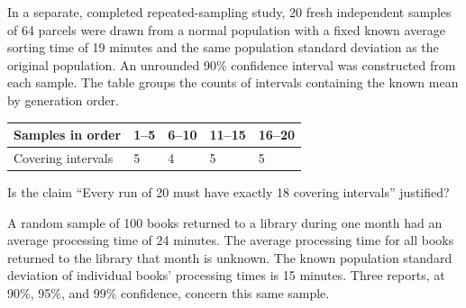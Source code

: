 In a separate, completed repeated-sampling study, 20 fresh independent samples of 64 parcels were drawn from a normal population with a fixed known average sorting time of 19 minutes and the same population standard deviation as the original population. An unrounded 90\% confidence interval was constructed from each sample. The table groups the counts of intervals containing the known mean by generation order.

\begin{center}\begin{tabular}{@{}lllll@{}}\toprule
Samples in order & 1--5 & 6--10 & 11--15 & 16--20\\\midrule
Covering intervals & 5 & 4 & 5 & 5\\
\bottomrule\end{tabular}\end{center}


\BlankInformationTable
\clearpage
{}

Is the claim ``Every run of 20 must have exactly 18 covering intervals'' justified?

\workspace{1.5in}
\vfill

\clearpage
{}
A random sample of 100 books returned to a library during one month had an average processing time of 24 minutes. The average processing time for all books returned to the library that month is unknown. The known population standard deviation of individual books' processing times is 15 minutes. Three reports, at 90\%, 95\%, and 99\% confidence, concern this same sample.

